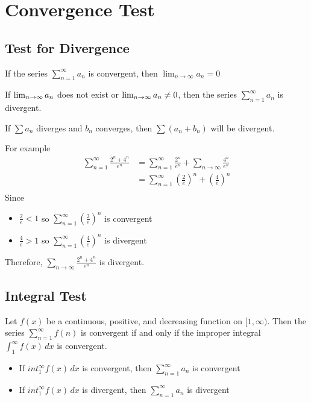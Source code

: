\chapter{Convergence Test}

\section{Test for Divergence}

\begin{theorem}
  If the series \(\sum_{n = 1}^{\infty} a_{n}\) is convergent, then \(\lim_{n \to \infty} a_{n} = 0\)
\end{theorem}

\begin{corollary}
  If \(\lim_{n \to \infty} a_{n}\) does not exist or \(\lim_{n \to \infty} a_{n} \neq 0\), then the series \(\sum_{n = 1}^{\infty} a_{n}\) is divergent.
\end{corollary}

\begin{lemma}
  If \(\sum a_{n}\) diverges and \(b_{n}\) converges, then \(\sum (a_{n} + b_{n})\) will be divergent.
\end{lemma}

For example
\begin{equation}
  \nonumber
  \begin{aligned}
    \sum_{n=1}^{\infty} \frac{2^{n} + 4^{n}}{e^n} &= \sum_{n = 1}^{\infty} \frac{2^{n}}{e^{n}} + \sum_{n \to \infty} \frac{4^{n}}{e^{n}} \\
    &= \sum_{n=1}^{\infty} (\frac{2}{e})^{n} + (\frac{4}{e})^{n} \\
  \end{aligned}
\end{equation}
Since 
\begin{itemize}
  \item \(\frac{2}{e} < 1\) so \(\sum_{n=1}^{\infty} (\frac{2}{e})^{n}\) is convergent
  \item \(\frac{4}{e} > 1\) so \(\sum_{n=1}^{\infty} (\frac{4}{e})^{n}\) is divergent
\end{itemize}

Therefore, \(\sum_{n \to \infty} \frac{2^{n} + 4^{n}}{e^n}\) is divergent.

\section{Integral Test}

\begin{theorem}
  Let \(f(x)\) be a continuous, positive, and decreasing function on \([1, \infty)\). Then the series \(\sum_{n = 1}^{\infty} f(n)\) is convergent if and only if the improper integral \(\int_{1}^{\infty} f(x) \, dx\) is convergent.
  \begin{itemize}
    \item If \(int_{1}^{\infty} f(x) \, dx\) is convergent, then \(\sum_{n=1}^{\infty} a_{n}\) is convergent
    \item If \(int_{1}^{\infty} f(x) \, dx\) is divergent, then \(\sum_{n=1}^{\infty} a_{n}\) is divergent
  \end{itemize}
\end{theorem}

